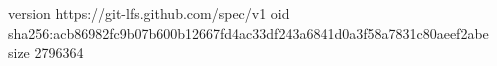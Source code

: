 version https://git-lfs.github.com/spec/v1
oid sha256:acb86982fc9b07b600b12667fd4ac33df243a6841d0a3f58a7831c80aeef2abe
size 2796364
